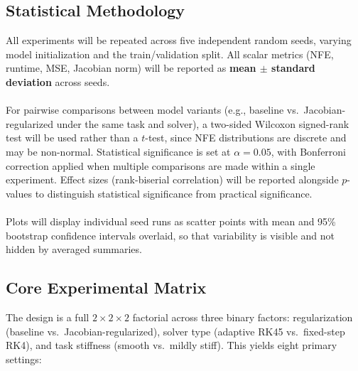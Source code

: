 \documentclass[11pt]{article}
\begin{document}
\subsection{Statistical Methodology}

All experiments will be repeated across five independent random seeds, varying model initialization and the train/validation split. All scalar metrics (NFE, runtime, MSE, Jacobian norm) will be reported as \textbf{mean $\pm$ standard deviation} across seeds.\\\\
For pairwise comparisons between model variants (e.g., baseline vs.\ Jacobian-regularized under the same task and solver), a two-sided Wilcoxon signed-rank test will be used rather than a $t$-test, since NFE distributions are discrete and may be non-normal. Statistical significance is set at $\alpha = 0.05$, with Bonferroni correction applied when multiple comparisons are made within a single experiment. Effect sizes (rank-biserial correlation) will be reported alongside $p$-values to distinguish statistical significance from practical significance.\\\\
Plots will display individual seed runs as scatter points with mean and 95\% bootstrap confidence intervals overlaid, so that variability is visible and not hidden by averaged summaries.

\subsection{Core Experimental Matrix}

The design is a full $2 \times 2 \times 2$ factorial across three binary factors: regularization (baseline vs.\ Jacobian-regularized), solver type (adaptive RK45 vs.\ fixed-step RK4), and task stiffness (smooth vs.\ mildly stiff). This yields eight primary settings:
\end{document}
